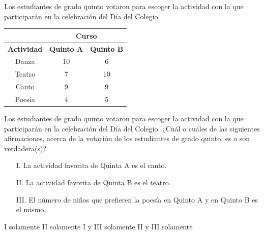 \documentclass[10pt,letterpaper,addpoints]{exam}
\begin{document}
\begin{multicols}{2}
\begin{questions}
{Los estudiantes de grado quinto votaron para escoger la actividad con la que participarán en la celebración del Día del Colegio.}
\begin{center}
\begin{tabular}{|c|c|c|}
\hline 
 & \multicolumn{2}{c|}{Curso} \\ 
\hline 
\textbf{Actividad} & \textbf{Quinto A} & \textbf{Quinto B} \\ 
\hline 
Danza & 10 & 6 \\ 
\hline 
Teatro & 7 & 10 \\ 
\hline 
Canto & 9 & 9 \\ 
\hline 
Poes\'{i}a & 4 & 5 \\ 
\hline 
\end{tabular} 
\end{center}
Los estudiantes de grado quinto votaron para escoger la actividad con la que participarán en la celebración del Día del Colegio.
\question \label{q-01}
¿Cuál o cuáles de las siguientes afirmaciones, acerca de la votación de los estudiantes de grado quinto, es o son verdadera(s)?
\begin{itemize}
\item[I.] La actividad favorita de Quinta A es el canto.
\item[II.] La actividad favorita de Quinta B es el teatro.
\item[III.] El número de niños que prefieren la poesía en Quinto A y en Quinto B es el mismo.
\end{itemize}
\begin{multicols}{2}
\begin{choices}
\choice I solamente
\CorrectChoice II solamente
\choice I y III solamente
\choice II y III solamente
\end{choices}
\end{multicols}
\end{questions}
\end{multicols}
\end{document}
